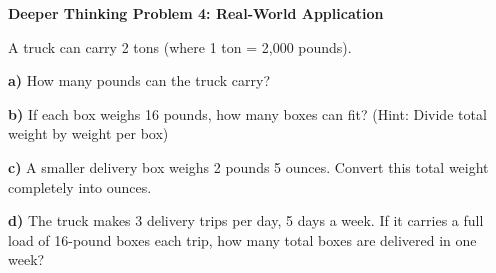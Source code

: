 \documentclass[12pt, letterpaper, fleqn]{article}
\begin{document}
\vspace{4mm}

\begin{tcolorbox}[colback=white!15, colframe=black, boxrule=1.5pt, arc=4mm, left=6mm, right=6mm, top=5mm, bottom=5mm]

\textbf{Deeper Thinking Problem 4: Real-World Application}

\medskip

\noindent
A truck can carry 2 tons (where 1 ton = 2,000 pounds).

\noindent
\textbf{a)} How many pounds can the truck carry?

\vspace{4cm}

\noindent
\textbf{b)} If each box weighs 16 pounds, how many boxes can fit? (Hint: Divide total weight by weight per box)

\vspace{4cm}

\noindent
\textbf{c)} A smaller delivery box weighs 2 pounds 5 ounces. Convert this total weight completely into ounces.

\vspace{4cm}


\noindent
\textbf{d)} The truck makes 3 delivery trips per day, 5 days a week. If it carries a full load of 16-pound boxes each trip, how many total boxes are delivered in one week?

\vspace{3cm}

\end{tcolorbox}
\end{document}
